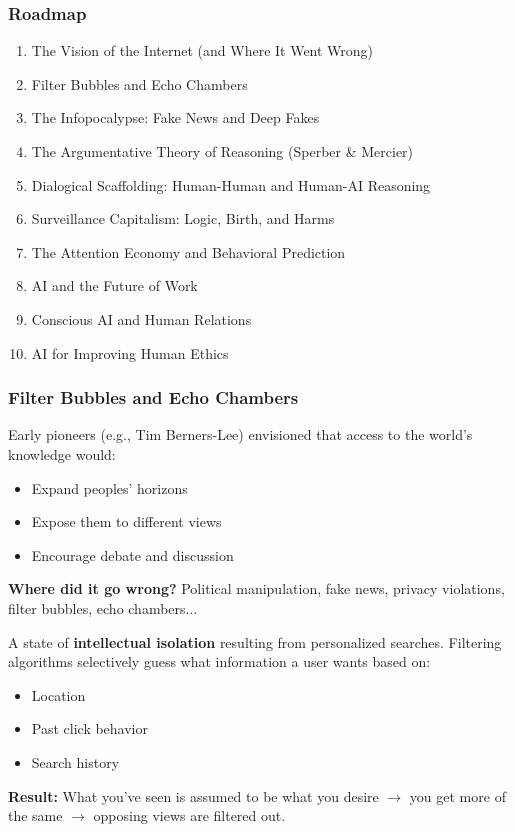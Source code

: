 \subsubsection*{Roadmap}
\begin{enumerate}
  \item The Vision of the Internet (and Where It Went Wrong)
  \item Filter Bubbles and Echo Chambers
  \item The Infopocalypse: Fake News and Deep Fakes
  \item The Argumentative Theory of Reasoning (Sperber \& Mercier)
  \item Dialogical Scaffolding: Human-Human and Human-AI Reasoning
  \item Surveillance Capitalism: Logic, Birth, and Harms
  \item The Attention Economy and Behavioral Prediction
  \item AI and the Future of Work
  \item Conscious AI and Human Relations
  \item AI for Improving Human Ethics
\end{enumerate}

\bigseparator

\subsubsection{Filter Bubbles and Echo Chambers}

\begin{keybox}
Early pioneers (e.g., Tim Berners-Lee) envisioned that access to the world's knowledge would:
\begin{itemize}
  \item Expand peoples' horizons
  \item Expose them to different views
  \item Encourage debate and discussion
\end{itemize}

\textbf{Where did it go wrong?} Political manipulation, fake news, privacy violations, filter bubbles, echo chambers...
\end{keybox}

\begin{defbox}
A state of \textbf{intellectual isolation} resulting from personalized searches. Filtering algorithms selectively guess what information a user wants based on:
\begin{itemize}
  \item Location
  \item Past click behavior
  \item Search history
\end{itemize}

\textbf{Result:} What you've seen is assumed to be what you desire $\to$ you get more of the same $\to$ opposing views are filtered out.
\end{defbox}

